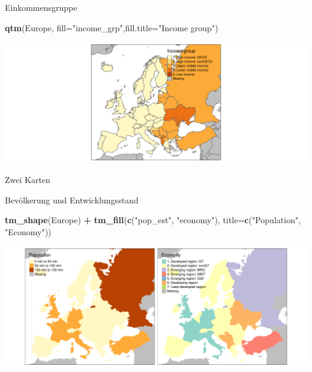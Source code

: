 \documentclass[ignorenonframetext,]{beamer}
\newenvironment{Shaded}{\begin{snugshade}}{\end{snugshade}}
\newcommand{\KeywordTok}[1]{\textcolor[rgb]{0.13,0.29,0.53}{\textbf{#1}}}
\newcommand{\DataTypeTok}[1]{\textcolor[rgb]{0.13,0.29,0.53}{#1}}
\newcommand{\StringTok}[1]{\textcolor[rgb]{0.31,0.60,0.02}{#1}}
\newcommand{\OperatorTok}[1]{\textcolor[rgb]{0.81,0.36,0.00}{\textbf{#1}}}
\newcommand{\NormalTok}[1]{#1}
\begin{document}
\begin{frame}[fragile]{Einkommensgruppe}

\begin{Shaded}
\begin{Highlighting}[]
\KeywordTok{qtm}\NormalTok{(Europe, }\DataTypeTok{fill=}\StringTok{"income_grp"}\NormalTok{,}\DataTypeTok{fill.title=}\StringTok{"Income group"}\NormalTok{) }
\end{Highlighting}
\end{Shaded}

\includegraphics{tmap_files/figure-beamer/unnamed-chunk-21-1.pdf}

\end{frame}

\begin{frame}[fragile]{Zwei Karten}

\begin{block}{Bevölkerung und Entwicklungsstand}

\begin{Shaded}
\begin{Highlighting}[]
\KeywordTok{tm_shape}\NormalTok{(Europe) }\OperatorTok{+}
\StringTok{    }\KeywordTok{tm_fill}\NormalTok{(}\KeywordTok{c}\NormalTok{(}\StringTok{"pop_est"}\NormalTok{, }\StringTok{"economy"}\NormalTok{), }
        \DataTypeTok{title=}\KeywordTok{c}\NormalTok{(}\StringTok{"Population"}\NormalTok{, }\StringTok{"Economy"}\NormalTok{))}
\end{Highlighting}
\end{Shaded}

\includegraphics{tmap_files/figure-beamer/unnamed-chunk-22-1.pdf}

\end{block}

\end{frame}
\end{document}
